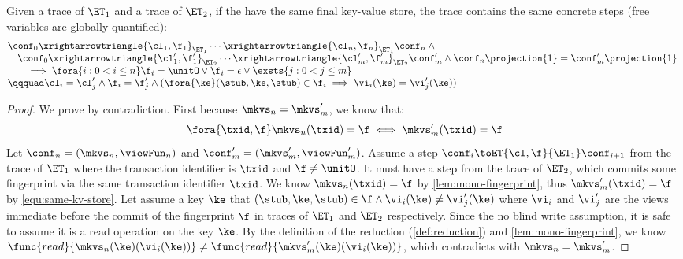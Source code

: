 \begin{lemma}
\label{lem:identical-step}
Given a trace of \( \ET_1 \) and a trace of \( \ET_2 \),
if the have the same final key-value store,
the trace contains the same concrete steps (free variables are globally quantified):
\[
\begin{array}{@{}l}
    \conf_0 \xrightarrowtriangle{\cl_1, \f_1}_{\ET_{1}} \cdots \xrightarrowtriangle{\cl_n, \f_n}_{\ET_{1}} \conf_n \land {} \\
    \quad \conf_0 \xrightarrowtriangle{\cl'_1, \f'_1}_{\ET_{2}} \cdots \xrightarrowtriangle{\cl'_m, \f'_m}_{\ET_{2}} \conf'_m 
    \land \conf_n\projection{1} = \conf'_m\projection{1} \\
    \qquad \implies \fora{i: 0 < i \leq n} 
    \f_i = \unitO 
    \lor \f_i = \epsilon 
    \lor \exsts{j: 0 < j \leq m} \\
    \qqquad \cl_i = \cl'_j \land \f_i = \f'_j \land ( \fora{\ke} (\stub, \ke, \stub) \in \f_i \implies \vi_i(\ke) = \vi'_j(\ke) )
\end{array}
\]
\end{lemma} 
\begin{proof}
    We prove by contradiction.
    First because \( \mkvs_n = \mkvs'_m \), we know that:
    \begin{equation}
        \label{equ:same-kv-store}
        \fora{\txid, \f} \mkvs_n(\txid) = \f \iff \mkvs'_m(\txid) = \f
    \end{equation}
    Let \(\conf_n = (\mkvs_n,\viewFun_n) \) and \(\conf'_m = (\mkvs'_m,\viewFun'_m) \).
    Assume a step \( \conf_i \toET{\cl, \f }{\ET_1} \conf_{i+1} \)  from the trace of \( \ET_1 \) where the transaction identifier is \( \txid \) and \( \f \neq \unitO \).
    It must have a step from the trace of \( \ET_2 \), which commits some fingerprint via the same transaction identifier  \( \txid \).
    We know \( \mkvs_n(\txid) = \f \) by \cref{lem:mono-fingerprint}, thus \( \mkvs'_m(\txid) = \f \) by \cref{equ:same-kv-store}.
    Let assume a key \( \ke \) that \( (\stub, \ke, \stub) \in \f \land \vi_i(\ke) \neq \vi'_j(\ke)\) where \( \vi_i\) and \( \vi'_j\) are the views immediate before the commit of the fingerprint \( \f \) in traces of \( \ET_1\) and \( \ET_2 \) respectively.
    Since the no blind write assumption, it is safe to assume it is a read operation on the key \( \ke \).
    By the definition of the reduction (\cref{def:reduction}) and \cref{lem:mono-fingerprint}, we know \( \func{read}{\mkvs_n(\ke)(\vi_i(\ke))} \neq \func{read}{\mkvs'_m(\ke)(\vi_i(\ke))} \), which contradicts with \( \mkvs_n = \mkvs'_m \).
\end{proof}


